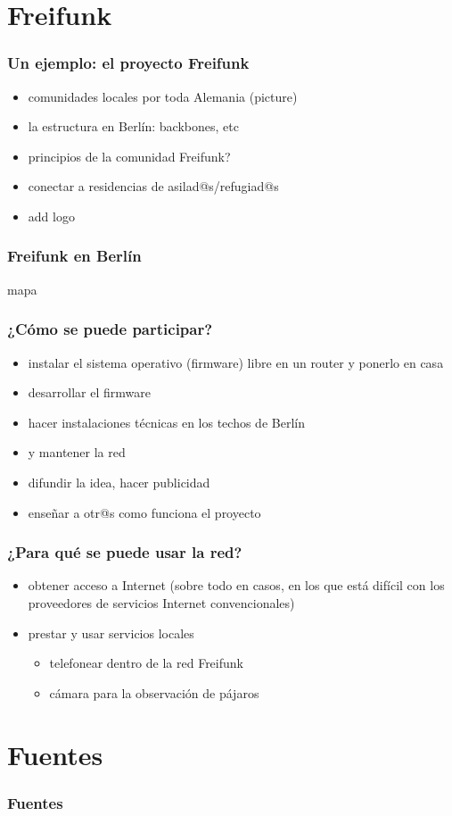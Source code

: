 \documentclass[12pt, xcolor=table]{beamer}
\begin{document}
\section{Freifunk}
\begin{frame}
  \frametitle{Un ejemplo: el proyecto Freifunk}
  \begin{itemize}
    \item comunidades locales por toda Alemania (picture)
    \item la estructura en Berlín: backbones, etc
    \item principios de la comunidad Freifunk?
    \item conectar a residencias de asilad@s/refugiad@s
    \item add logo
  \end{itemize}
\end{frame}

\begin{frame}
  \frametitle{Freifunk en Berlín}
  mapa
\end{frame}

\begin{frame}
  \frametitle{¿Cómo se puede participar?}
  \begin{itemize}
    \item instalar el sistema operativo (firmware) libre en un router y ponerlo en casa
    \item desarrollar el firmware
    \item hacer instalaciones técnicas en los techos de Berlín
    \item y mantener la red
    \item difundir la idea, hacer publicidad
    \item enseñar a otr@s como funciona el proyecto
  \end{itemize}
\end{frame}

\begin{frame}
  \frametitle{¿Para qué se puede usar la red?}
  \begin{itemize}
    \item obtener acceso a Internet (sobre todo en casos, en los que está difícil con los proveedores de servicios Internet convencionales)
    \item prestar y usar servicios locales
      \begin{itemize}
        \item telefonear dentro de la red Freifunk
        \item cámara para la observación de pájaros
      \end{itemize}
  \end{itemize}
\end{frame}

\section{Fuentes}
\begin{frame}
  \frametitle{Fuentes}
  \nocite{*}
  
  
\end{frame}
\end{document}

